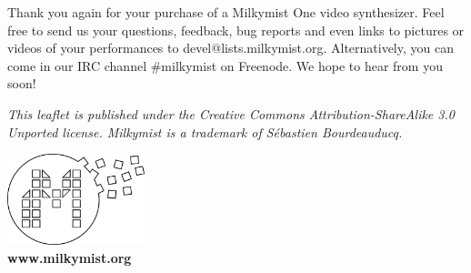 \documentclass{leaflet}
\begin{document}
Thank you again for your purchase of a Milkymist One video synthesizer. Feel free to send us your questions, feedback, bug reports and even links to pictures or videos of your performances to devel@lists.milkymist.org. Alternatively, you can come in our IRC channel \#milkymist on Freenode. We hope to hear from you soon!

\textit{This leaflet is published under the Creative Commons Attribution-ShareAlike 3.0 Unported license. Milkymist is a trademark of S\'ebastien Bourdeauducq.}

\begin{center}
\includegraphics[width=40mm]{logo.pdf} \\
\textbf{www.milkymist.org}
\end{center}
\end{document}
